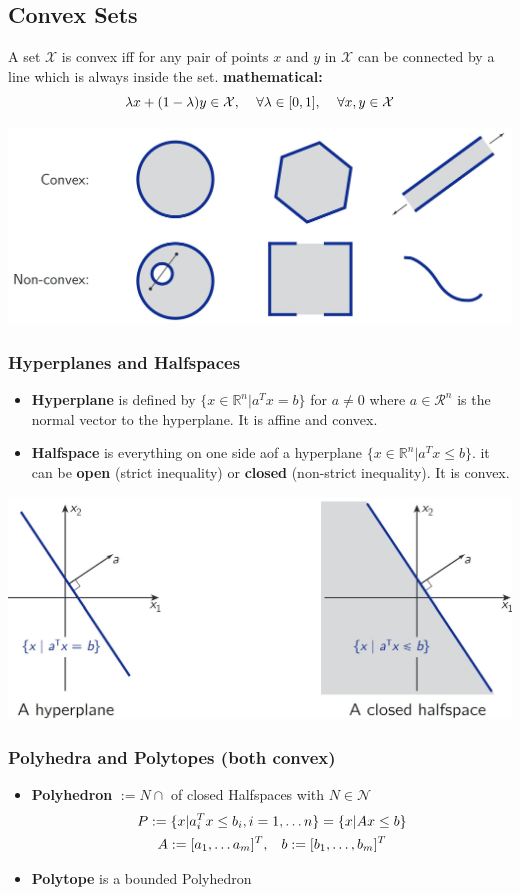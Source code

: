 \subsection{Convex Sets}
A set $\mathcal{X}$ is convex iff for any pair of points $x$ and $y$ in $\mathcal{X}$ can be connected by a line which is always inside the set.
\textbf{mathematical:} \[\lambda x + (1-\lambda) y\in \mathcal{X}, \hspace{4mm} \forall \lambda\in [0,1], \hspace{4mm} \forall x,y \in \mathcal{X} \]
\begin{center}
    \includegraphics[width= 0.5\linewidth]{MPC_summary/Images/Convex_Non_Convex.jpg}
\end{center}
\subsubsection{Hyperplanes and Halfspaces}
\begin{itemize}
    \item \textbf{Hyperplane} is defined by $\{x\in\mathbb{R}^n| a^Tx = b \}$ for $a \neq 0$ where $a \in \mathcal{R}^n$ is the normal vector to the hyperplane. It is affine and convex.
    \item \textbf{Halfspace} is everything on one side aof a hyperplane $\{x \in \mathbb{R}^n | a^T x \leq b\}$. it can be \textbf{open} (strict inequality) or \textbf{closed} (non-strict inequality). It is convex.
\end{itemize}
\begin{center}
    \includegraphics[width= 0.5\linewidth]{MPC_summary/Images/hyperplane_halfspaces.jpg}
\end{center}
\subsubsection{Polyhedra and Polytopes {\tiny(both convex)}}
\begin{itemize}
    \item \textbf{Polyhedron} $:= N \cap$ of closed Halfspaces with $N \in \mathcal{N}$  
    \begin{gather*}P := \{x|a^T_i x \leq b_i,i=1, \dots n\} = \{x|Ax \leq b\}\\
    A := [a_1, \dots a_m]^T,\hspace{3mm} b := [b_1,\dots,b_m]^T
    \end{gather*}
    \item \textbf{Polytope} is a bounded Polyhedron
\end{itemize}

